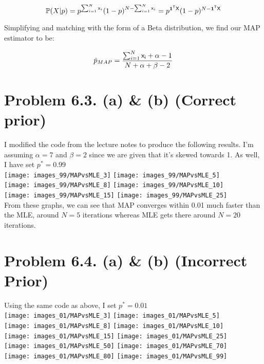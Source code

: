 \documentclass{article}
\begin{document}
\[ \mathbb{P}(X|p) = p^{\sum_{i=1}^{N} {\sf{x}}_i} (1 - p)^{N - \sum_{i=1}^{N} {\sf{x}}_i} =  p^{\textbf{1}^{{\sf{T}}}{\sf{X}}} (1 - p)^{N-\textbf{1}^{{\sf{T}}}{\sf{X}}} \]

Simplifying and matching with the form of a Beta distribution, we find our MAP estimator to be:

\[ \hat{p}_{MAP} = \frac{\sum_{i=1}^{N} {\sf{x}_i} + \alpha - 1}{N + \alpha + \beta - 2} \]

\section*{Problem 6.3. (a) \& (b) (Correct prior)}
I modified the code from the lecture notes to produce the following results. I'm assuming $\alpha = 7$ and $\beta = 2$ since we are given that it's skewed towards 1. As well, I have set $p^* = 0.99$
\\
\texttt{[image: images\_99/MAPvsMLE\_3]}
\texttt{[image: images\_99/MAPvsMLE\_5]} \\
\texttt{[image: images\_99/MAPvsMLE\_8]} 
\texttt{[image: images\_99/MAPvsMLE\_10]} \\
\texttt{[image: images\_99/MAPvsMLE\_15]}
\texttt{[image: images\_99/MAPvsMLE\_25]} \\

From these graphs, we can see that MAP converges within 0.01 much faster than the MLE, around $N = 5$ iterations whereas MLE gets there around $N = 20$ iterations.

\section*{Problem 6.4. (a) \& (b) (Incorrect Prior)}
Using the same code as above, I set $p^* = 0.01$
\\
\texttt{[image: images\_01/MAPvsMLE\_3]}
\texttt{[image: images\_01/MAPvsMLE\_5]} \\
\texttt{[image: images\_01/MAPvsMLE\_8]} 
\texttt{[image: images\_01/MAPvsMLE\_10]} \\
\texttt{[image: images\_01/MAPvsMLE\_15]}
\texttt{[image: images\_01/MAPvsMLE\_25]} \\
\texttt{[image: images\_01/MAPvsMLE\_50]}
\texttt{[image: images\_01/MAPvsMLE\_70]} \\
\texttt{[image: images\_01/MAPvsMLE\_80]}
\texttt{[image: images\_01/MAPvsMLE\_99]} \\
\end{document}
